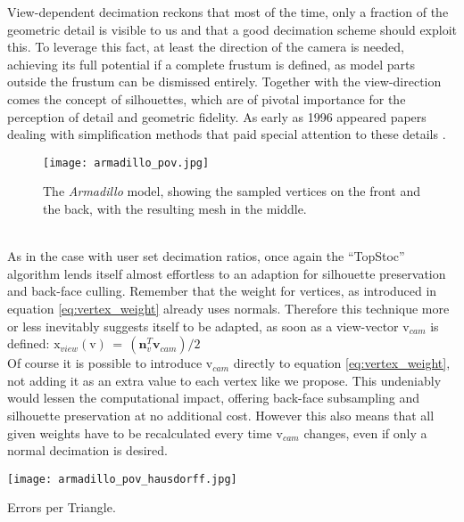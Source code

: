 View-dependent decimation reckons that most of the time, only a fraction of the geometric detail is visible to us and that a good decimation scheme should exploit this.  
To leverage this fact, at least the direction of the camera is needed, achieving its full potential if a complete frustum is defined, as model parts outside the frustum can be dismissed entirely.
Together with the view-direction comes the concept of silhouettes, which are of pivotal importance for the perception of detail and geometric fidelity.
As early as 1996 appeared papers dealing with simplification methods that paid special attention to these details \citep[cf.][in which, not only view-dependencies but also decimation adapting to lighting conditions, gets discussed]{Xia1996}.
\begin{figure}[ht]
\centering
\texttt{[image: armadillo\_pov.jpg]}
\caption{The \textit{Armadillo} model, showing the sampled vertices on the front and the back, with the resulting mesh in the middle.}
\label{fig:armadillo_pov}
\end{figure}\\
As in the case with user set decimation ratios, once again the ``TopStoc'' algorithm lends itself almost effortless to an adaption for silhouette preservation and back-face culling.
Remember that the weight for vertices, as introduced in equation \ref{eq:vertex_weight} already uses normals.
Therefore this technique more or less inevitably suggests itself to be adapted, as soon as a view-vector $\mathrm{v}_{cam}$ is defined: $\mathrm{x}_{view}(\mathrm{v}) \,=\, (\textbf{n}^{T}_{v}\textbf{v}_{cam})/2$\\
Of course it is possible to introduce $\mathrm{v}_{cam}$ directly to equation \ref{eq:vertex_weight}, not adding it as an extra value to each vertex like we propose.
This undeniably would lessen the computational impact, offering back-face subsampling and silhouette preservation at no additional cost.
However this also means that all given weights have to be recalculated every time $\mathrm{v}_{cam}$ changes, even if only a normal decimation is desired.\\
\begin{floatingfigure}[r]{0.31\textwidth}
\center
\texttt{[image: armadillo\_pov\_hausdorff.jpg]}
\caption{Errors per Triangle.}
\label{fig:armadillo_pov_hausdorff}
\end{floatingfigure}
